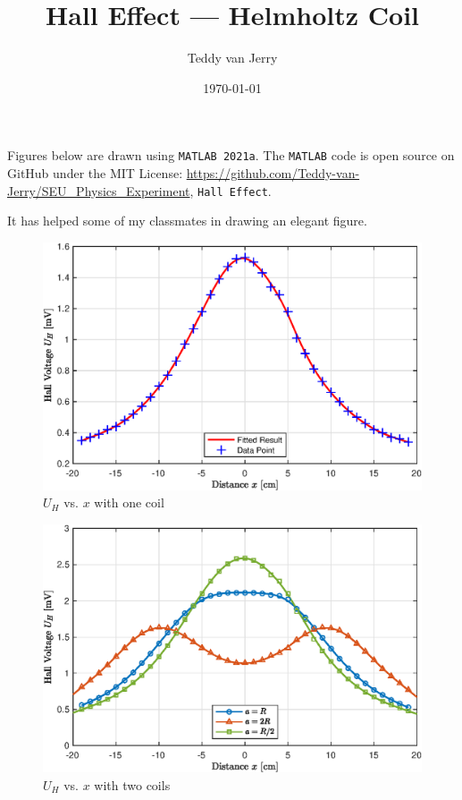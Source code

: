 \documentclass{article}
\title{\huge Hall Effect --- Helmholtz Coil}
\author{Teddy van Jerry}
\date{\today}
\begin{document}
    \maketitle

    Figures below are drawn using \texttt{MATLAB 2021a}.
    The \texttt{MATLAB} code is open source on GitHub under the MIT License: \url{https://github.com/Teddy-van-Jerry/SEU_Physics_Experiment}, \texttt{Hall Effect}.

    It has helped some of my classmates in drawing an elegant figure.

    \begin{figure}[htbp]
        \centering
        \includegraphics[width=.75\linewidth]{One.eps}
        \caption{$U_H$ vs. $x$ with one coil}
        \label{fig:one}
    \end{figure}
    \begin{figure}[htbp]
        \centering
        \includegraphics[width=.75\linewidth]{Two.eps}
        \caption{$U_H$ vs. $x$ with two coils}
        \label{fig:two}
    \end{figure}
\end{document}
